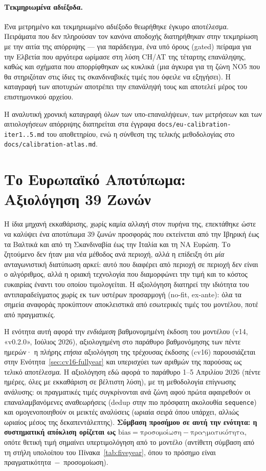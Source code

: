\paragraph{Τεκμηριωμένα αδιέξοδα.}
Ένα μετρημένο και τεκμηριωμένο αδιέξοδο θεωρήθηκε έγκυρο αποτέλεσμα. Πειράματα που δεν πληρούσαν τον κανόνα αποδοχής διατηρήθηκαν στην τεκμηρίωση με την αιτία της απόρριψης --- για παράδειγμα, ένα υπό όρους (gated) πείραμα για την Ελβετία που αργότερα ωρίμασε στη λύση CH/AT της τέταρτης επανάληψης, καθώς και σχήματα που απορρίφθηκαν ως κυκλικά (μια άγκυρα για τη ζώνη NO5 που θα στηριζόταν στις ίδιες τις σκανδιναβικές τιμές που όφειλε να εξηγήσει). Η καταγραφή των αποτυχιών αποτρέπει την επανάληψή τους και αποτελεί μέρος του επιστημονικού αρχείου.

Η αναλυτική χρονική καταγραφή όλων των υπο-επαναλήψεων, των μετρήσεων και των αιτιολογήσεων απόρριψης διατηρείται στα έγγραφα \texttt{docs/eu-calibration-iter1..5.md} του αποθετηρίου, ενώ η σύνθεση της τελικής μεθοδολογίας στο \texttt{docs/calibration-atlas.md}.


\section{Το Ευρωπαϊκό Αποτύπωμα: Αξιολόγηση 39 Ζωνών}
\label{sec:eu-footprint}

Η ίδια μηχανή εκκαθάρισης, χωρίς καμία αλλαγή στον πυρήνα της, επεκτάθηκε ώστε να καλύψει ένα αποτύπωμα 39 ζωνών προσφοράς που εκτείνεται από την Ιβηρική έως τα Βαλτικά και από τη Σκανδιναβία έως την Ιταλία και τη ΝΑ Ευρώπη. Το ζητούμενο δεν ήταν μια νέα μέθοδος ανά περιοχή, αλλά η επίδειξη ότι \emph{μία} ανταγωνιστική διατύπωση αρκεί: αυτό που διαφέρει από περιοχή σε περιοχή δεν είναι ο αλγόριθμος, αλλά η οριακή τεχνολογία που διαμορφώνει την τιμή και το κόστος ευκαιρίας έναντι του οποίου τιμολογείται. Η αξιολόγηση διατηρεί την ιδιότητα του αντιπαραδείγματος χωρίς εκ των υστέρων προσαρμογή (no-fit, ex-ante): όλα τα σημεία αναφοράς προκύπτουν αποκλειστικά από εσωτερικές τιμές του μοντέλου, ποτέ από πραγματικές.

Η ενότητα αυτή αφορά την \emph{ενδιάμεση} βαθμονομημένη έκδοση του μοντέλου (v14, «v0.2.0», Ιούλιος 2026), αξιολογημένη στο παράθυρο βαθμονόμησης των πέντε ημερών· η πλήρης \emph{ετήσια} αξιολόγηση της τρέχουσας έκδοσης (cv16) παρουσιάζεται στην Ενότητα~\ref{sec:cv16-fullyear} και υπερισχύει των αριθμών της παρούσας ως τελικό αποτέλεσμα. Η αξιολόγηση εδώ αφορά το παράθυρο 1--5 Απριλίου 2026 (πέντε ημέρες, όλες με εκκαθάριση σε βέλτιστη λύση), με τη μεθοδολογία επίγνωσης ανάλυσης: οι πραγματικές τιμές συγκρίνονται ανά ζώνη αφού πρώτα αφαιρεθούν οι επαναλαμβανόμενες αναθεωρήσεις (dedup στην πιο πρόσφατη ακολουθία \texttt{sequence}) και ομογενοποιηθούν οι μεικτές αναλύσεις (ωριαία σειρά όπου υπάρχει, αλλιώς ωριαίος μέσος της δεκαπεντάλεπτης). \textbf{Σύμβαση προσήμου σε αυτή την ενότητα: η συστηματική απόκλιση ορίζεται ως $\text{bias} = \text{προσομοίωση} - \text{πραγματικότητα}$}, οπότε θετική τιμή σημαίνει υπερτιμολόγηση από το μοντέλο (αντίθετη σύμβαση από τη στήλη υπολοίπου του Πίνακα~\ref{tab:fiveyear}, όπου το πρόσημο είναι πραγματικότητα~$-$~προσομοίωση).

